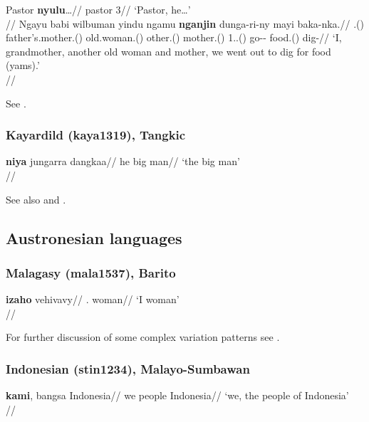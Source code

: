 \documentclass[A4paper]{article}
\begin{document}
\pex
\a 
\begingl
\gla Pastor \textbf{nyulu}\ldots//
\glb pastor 3\Sg{}//
\glft `Pastor, he\ldots'\\{\citep[after][202, (611); gloss extrapolated]{patz2002}}//
\endgl
\a
\begingl
\gla Ngayu babi wilbuman yindu ngamu \textbf{nganjin} dunga-ri-ny mayi baka-nka.//
\Sg{}.\Nom{}(\Sarg{}) father's.mother.\Abs{}(\Sarg) old.woman.\Abs{}(\Sarg{}) other.\Abs{}(\Sarg{}) mother.\Abs{}(\Sarg{}) 1\Pl{}.\Excl{}.\Nom{}(\Sarg{}) go-\Pl{}-\Pst{} food.\Abs{}(\Obj{}) dig-\Purp//
\glft `I, grandmother, another old woman and mother, we went out to dig for food (yams).' \\{\citep[after][203, (618)]{patz2002}}//
\endgl
\xe

See \citet[120f., 202f.]{patz2002}.

\subsubsection{Kayardild (kaya1319), Tangkic}

\ex
\begingl
\gla \textbf{niya} jungarra dangkaa//
\glb he big man//
\glft `the big man'\\\citep[239]{evans1995}//
\endgl
\xe

See also \citet[239; 251]{evans1995} and \citet[141]{round2013}.


\subsection{Austronesian languages}

\subsubsection{Malagasy (mala1537), Barito}

\ex
\begingl
\gla \textbf{izaho} vehivavy//
\Sg.\Def{} woman//
\glft `I woman'\\\citep[411, (6a)]{paultravis2019}//
\endgl
\xe

For further discussion of some complex variation patterns see \citet{paultravis2019}.
 
 
 \newpage
\subsubsection{Indonesian (stin1234), Malayo-Sumbawan}
	
\ex \begingl
\gla \textbf{kami}, bangsa Indonesia//
\glb we people Indonesia//
\glft `we, the people of Indonesia'\\\citep[170]{sneddon1996}//
\endgl
\xe
\end{document}
